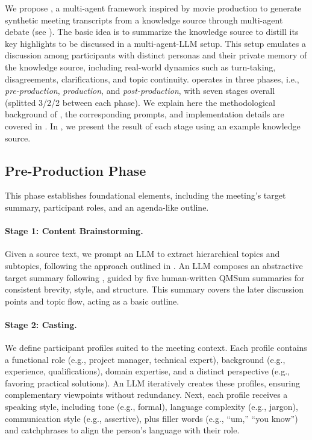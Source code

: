 \label{sec:pipeline}

We propose \pipeline{}, a multi-agent framework inspired by movie production to generate synthetic meeting transcripts from a knowledge source through multi-agent debate (see ).
The basic idea is to summarize the knowledge source to distill its key highlights to be discussed in a multi-agent-LLM setup.
This setup emulates a discussion among participants with distinct personas and their private memory of the knowledge source, including real-world dynamics such as turn-taking, disagreements, clarifications, and topic continuity.
\pipeline{} operates in three phases, i.e., \textit{pre-production}, \textit{production}, and \textit{post-production}, with seven stages overall (splitted 3/2/2 between each phase).
We explain here the methodological background of \pipeline{}, the corresponding prompts, and implementation details are covered in .
In , we present the result of each stage using an example knowledge source.




\subsection{Pre-Production Phase}
This phase establishes foundational elements, including the meeting’s target summary, participant roles, and an agenda-like outline.

\paragraph{Stage 1: Content Brainstorming.}
Given a source text, we prompt an LLM to extract hierarchical topics and subtopics, following the approach outlined in \citet{Paoli23a}.
An LLM composes an abstractive target summary following \citet{GaoJYZ24}, guided by five human-written QMSum summaries for consistent brevity, style, and structure.
This summary covers the later discussion points and topic flow, acting as a basic outline.



\paragraph{Stage 2: Casting.}
\label{sec:stage_2_casting}


We define participant profiles suited to the meeting context.
Each profile contains a functional role (e.g., project manager, technical expert), background (e.g., experience, qualifications), domain expertise, and a distinct perspective (e.g., favoring practical solutions).
An LLM iteratively creates these profiles, ensuring complementary viewpoints without redundancy.
Next, each profile receives a speaking style, including tone (e.g., formal), language complexity (e.g., jargon), communication style (e.g., assertive), plus filler words (e.g., ``um,'' ``you know'') and catchphrases to align the person's language with their role.

